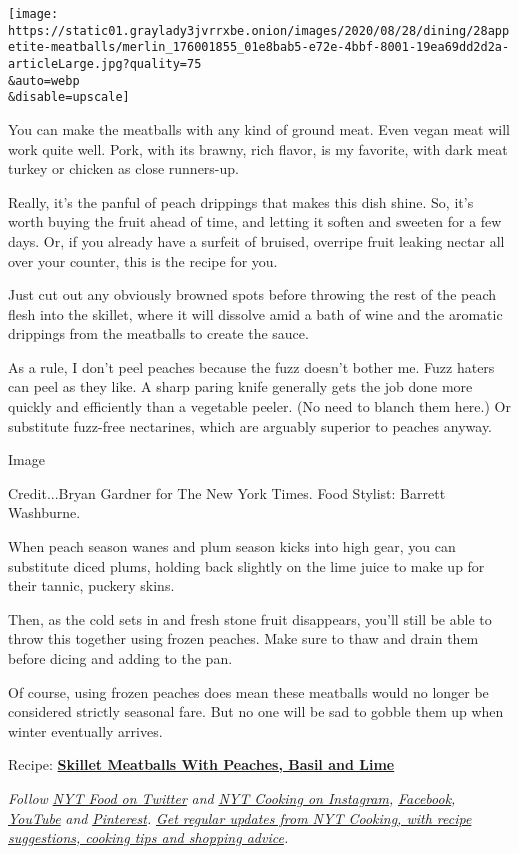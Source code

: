 \texttt{[image: https://static01.graylady3jvrrxbe.onion/images/2020/08/28/dining/28appetite-meatballs/merlin\_176001855\_01e8bab5-e72e-4bbf-8001-19ea69dd2d2a-articleLarge.jpg?quality=75\\\&auto=webp\\\&disable=upscale]}

You can make the meatballs with any kind of ground meat. Even vegan meat
will work quite well. Pork, with its brawny, rich flavor, is my
favorite, with dark meat turkey or chicken as close runners-up.

Really, it's the panful of peach drippings that makes this dish shine.
So, it's worth buying the fruit ahead of time, and letting it soften and
sweeten for a few days. Or, if you already have a surfeit of bruised,
overripe fruit leaking nectar all over your counter, this is the recipe
for you.

Just cut out any obviously browned spots before throwing the rest of the
peach flesh into the skillet, where it will dissolve amid a bath of wine
and the aromatic drippings from the meatballs to create the sauce.

As a rule, I don't peel peaches because the fuzz doesn't bother me. Fuzz
haters can peel as they like. A sharp paring knife generally gets the
job done more quickly and efficiently than a vegetable peeler. (No need
to blanch them here.) Or substitute fuzz-free nectarines, which are
arguably superior to peaches anyway.

Image

Credit...Bryan Gardner for The New York Times. Food Stylist: Barrett
Washburne.

When peach season wanes and plum season kicks into high gear, you can
substitute diced plums, holding back slightly on the lime juice to make
up for their tannic, puckery skins.

Then, as the cold sets in and fresh stone fruit disappears, you'll still
be able to throw this together using frozen peaches. Make sure to thaw
and drain them before dicing and adding to the pan.

Of course, using frozen peaches does mean these meatballs would no
longer be considered strictly seasonal fare. But no one will be sad to
gobble them up when winter eventually arrives.

Recipe:
\textbf{\href{https://cooking.nytimes3xbfgragh.onion/recipes/1021402-skillet-meatballs-with-peaches-basil-and-lime}{Skillet
Meatballs With Peaches, Basil and Lime}}

\emph{Follow} \href{https://twitter.com/nytfood}{\emph{NYT Food on
Twitter}} \emph{and}
\href{https://www.instagram.com/nytcooking/}{\emph{NYT Cooking on
Instagram}}\emph{,}
\href{https://www.facebookcorewwwi.onion/nytcooking/}{\emph{Facebook}}\emph{,}
\href{https://www.youtube.com/nytcooking}{\emph{YouTube}} \emph{and}
\href{https://www.pinterest.com/nytcooking/}{\emph{Pinterest}}\emph{.}
\href{https://www.nytimes3xbfgragh.onion/newsletters/cooking}{\emph{Get
regular updates from NYT Cooking, with recipe suggestions, cooking tips
and shopping advice}}\emph{.}

